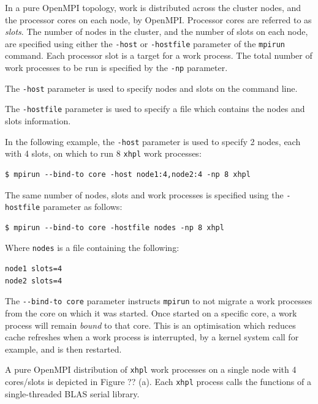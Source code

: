 \documentclass{report}
\begin{document}
In a pure OpenMPI topology, work is distributed across the cluster nodes, and the processor cores on each node, by OpenMPI. Processor cores are referred to as \emph{slots}. The number of nodes in the cluster, and the number of slots on each node, are specified using either the \verb|-host| or \verb|-hostfile| parameter of the \verb|mpirun| command. Each processor slot is a target for a work process. The total number of work processes to be run is specified by the \verb|-np| parameter.

The \verb|-host| parameter is used to specify nodes and slots on the command line.

The \verb|-hostfile| parameter is used to specify a file which contains the nodes and slots information.

In the following example, the \verb|-host| parameter is used to specify 2 nodes, each with 4 slots, on which to run 8 \verb|xhpl| work processes:

\lstset{style=type}
\begin{lstlisting}
$ mpirun --bind-to core -host node1:4,node2:4 -np 8 xhpl
\end{lstlisting}

The same number of nodes, slots and work processes is specified using the \verb|-hostfile| parameter as follows:

\lstset{style=type}
\begin{lstlisting}
$ mpirun --bind-to core -hostfile nodes -np 8 xhpl
\end{lstlisting}

Where \verb|nodes| is a file containing the following:

\lstset{style=listing}
\begin{lstlisting}[numbers=none, caption=nodes]
node1 slots=4
node2 slots=4
\end{lstlisting}

The \verb|--bind-to core| parameter instructs \verb|mpirun| to not migrate a work processes from the core on which it was started. Once started on a specific core, a work process will remain \emph{bound} to that core. This is an optimisation which reduces cache refreshes when a work process is interrupted, by a kernel system call for example, and is then restarted.

A pure OpenMPI distribution of \verb|xhpl| work processes on a single node with 4 cores/slots is depicted in Figure ?? (a). Each \verb|xhpl| process calls the functions of a single-threaded BLAS serial library.


%
%
\end{document}
